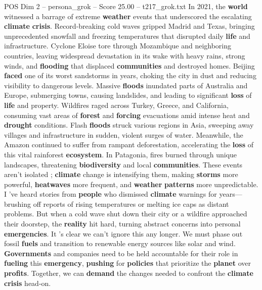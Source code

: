 \begin{textsample}{POS Dim 2 – persona\_grok – Score 25.00 – t217\_grok.txt}  \label{ex:f2_pos_038}
In 2021, the \textbf{world} witnessed a barrage of extreme \textbf{weather} events that underscored the escalating \textbf{climate} \textbf{crisis}.
Record-breaking cold waves gripped Madrid and Texas, bringing unprecedented snowfall and freezing temperatures that disrupted daily \textbf{life} and infrastructure.
Cyclone Eloise tore through Mozambique and neighboring countries, leaving widespread devastation in its wake with heavy rains, strong winds, and \textbf{flooding} that displaced \textbf{communities} and destroyed homes.
Beijing \textbf{faced} one of its worst sandstorms in years, choking the city in dust and reducing visibility to dangerous levels.
Massive \textbf{floods} inundated parts of Australia and Europe, submerging towns, causing landslides, and leading to significant \textbf{loss} of \textbf{life} and property.
Wildfires raged across Turkey, Greece, and California, consuming vast areas of \textbf{forest} and \textbf{forcing} evacuations amid intense heat and \textbf{drought} conditions.
Flash \textbf{floods} struck various regions in Asia, sweeping away villages and infrastructure in sudden, violent surges of water.
Meanwhile, the Amazon continued to suffer from rampant deforestation, accelerating the \textbf{loss} of this vital rainforest \textbf{ecosystem}.
In Patagonia, fires burned through unique landscapes, threatening \textbf{biodiversity} and local \textbf{communities}.
These events aren't isolated ; \textbf{climate} change is intensifying them, making \textbf{storms} more powerful, \textbf{heatwaves} more frequent, and \textbf{weather} \textbf{patterns} more unpredictable.
I 've heard stories from \textbf{people} who dismissed \textbf{climate} warnings for years—brushing off reports of rising temperatures or melting ice caps as distant problems.
But when a cold wave shut down their city or a wildfire approached their doorstep, the \textbf{reality} hit hard, turning abstract concerns into personal \textbf{emergencies}.
It 's clear we can't ignore this any longer.
We must phase out fossil \textbf{fuels} and transition to renewable energy sources like solar and wind. \textbf{Governments} and companies need to be held accountable for their role in \textbf{fueling} this \textbf{emergency}, \textbf{pushing} for \textbf{policies} that prioritize the \textbf{planet} over \textbf{profits}.
Together, we can \textbf{demand} the changes needed to confront the \textbf{climate} \textbf{crisis} head-on.

\end{textsample}
